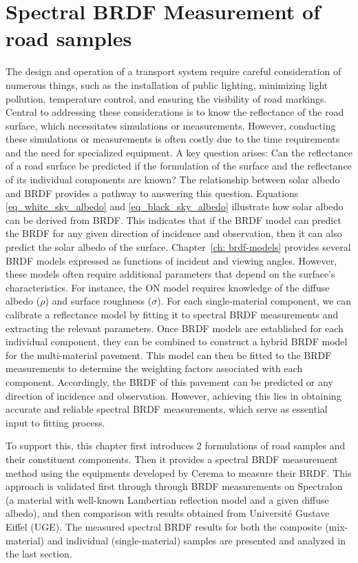 \chapter{Spectral BRDF Measurement of road samples}


The design and operation of a transport system require careful consideration of numerous things, such as the installation of public lighting, minimizing light pollution, temperature control, and ensuring the visibility of road markings.
Central to addressing these considerations is to know the reflectance of the road surface, which necessitates simulations or measurements.
However, conducting these simulations or measurements is often costly due to the time requirements and the need for specialized equipment.
A key question arises: Can the reflectance of a road surface be predicted if the formulation of the surface and the reflectance of its individual components are known?
The relationship between solar albedo and BRDF provides a pathway to answering this question.
Equations \eqref{eq_white_sky_albedo} and \eqref{eq_black_sky_albedo} illustrate how solar albedo can be derived from BRDF.
This indicates that if the BRDF model can predict the BRDF for any given direction of incidence and observation, then it can also predict the solar albedo of the surface.
Chapter~\ref{ch: brdf-models} provides several BRDF models expressed as functions of incident and viewing angles.
However, these models often require additional parameters that depend on the surface's characteristics.
For instance, the ON model requires knowledge of the diffuse albedo ($\rho$) and surface roughness ($\sigma$).
For each single-material component, we can calibrate a reflectance model by fitting it to spectral BRDF measurements and extracting the relevant parameters.
Once BRDF models are established for each individual component, they can be combined to construct a hybrid BRDF model for the multi-material pavement.
This model can then be fitted to the BRDF measurements to determine the weighting factors associated with each component.
Accordingly, the BRDF of this pavement can be predicted or any direction of incidence and observation.
However, achieving this lies in obtaining accurate and reliable spectral BRDF measurements, which serve as essential input to fitting process.

To support this, this chapter first introduces 2 formulations of road samples and their constituent components.
Then it provides a spectral BRDF measurement method using the equipments developed by Cerema to measure their BRDF.
This approach is validated first through through BRDF measurements on Spectralon (a material with well-known Lambertian reflection model and a given diffuse albedo), and then comparison with results obtained from Université Gustave Eiffel (UGE).
The measured spectral BRDF results for both the composite (mix-material) and individual (single-material) samples are presented and analyzed in the last section.


